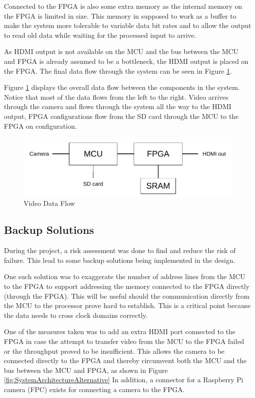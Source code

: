 Connected to the FPGA is also some extra memory as the internal memory on the FPGA is limited in size.
This memory in supposed to work as a buffer to make the system more tolerable to variable data bit rates and to allow the output to read old data while waiting for the processed input to arrive.

As HDMI output is not available on the MCU and the bus between the MCU and FPGA is already assumed to be a bottleneck, the HDMI output is placed on the FPGA.
The final data flow through the system can be seen in Figure \ref{fig:SystemArchitecture}.

Figure \ref{fig:SystemArchitecture} displays the overall data flow between the components in the system.
Notice that most of the data flows from the left to the right. Video arrives through the camera and flows through the system all the way to the HDMI output, FPGA configurations flow from the SD card through the MCU to the FPGA on configuration.

\begin{figure}
    \includegraphics{img/SystemArchitecture}
    \caption{Video Data Flow}
    \label{fig:SystemArchitecture}
\end{figure}

\subsection{Backup Solutions} \label{subsec:RiskAssessment}
During the project, a risk assessment was done to find and reduce the risk of failure.
This lead to some backup solutions being implemented in the design.

One such solution was to exaggerate the number of address lines from the MCU to the FPGA to support addressing the memory connected to the FPGA directly (through the FPGA).
This will be useful should the communication directly from the MCU to the processor prove hard to establish.
This is a critical point because the data needs to cross clock domains correctly.

One of the measures taken was to add an extra HDMI port connected to the FPGA in case the attempt to transfer video from the MCU to the FPGA failed or the throughput proved to be insufficient.
This allows the camera to be connected directly to the FPGA and thereby circumvent both the MCU and the bus between the MCU and FPGA, as shown in Figure \ref{fig:SystemArchitectureAlternative}
In addition, a connector for a Raspberry Pi camera (FPC) exists for connecting a camera to the FPGA.

